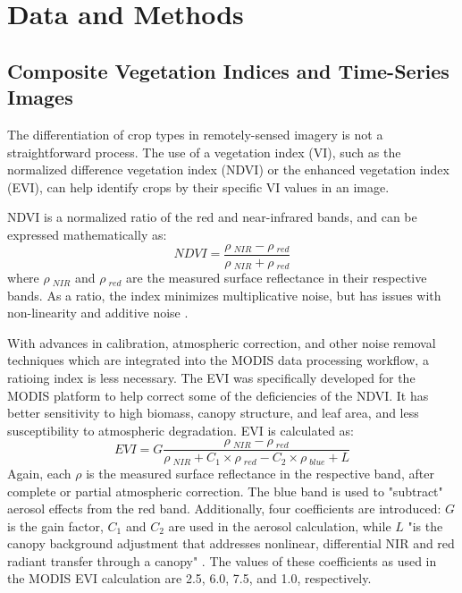 \chapter{Data and Methods}

\section{Composite Vegetation Indices and Time-Series Images}

The differentiation of crop types in remotely-sensed imagery is not a straightforward process. The use of a vegetation index (VI), such as the normalized difference vegetation index (NDVI) or the enhanced vegetation index (EVI), can help identify crops by their specific VI values in an image.

NDVI is a normalized ratio of the red and near-infrared bands, and can be expressed mathematically as:
\begin{equation}
  NDVI = \frac{\rho~_{NIR} - \rho~_{red}}{\rho~_{NIR} + \rho~_{red}}
\end{equation}
where $\rho~_{NIR}$ and $\rho~_{red}$ are the measured surface reflectance in their respective bands. As a ratio, the index minimizes multiplicative noise, but has issues with non-linearity and additive noise \autocite{huete2002overview}.

With advances in calibration, atmospheric correction, and other noise removal techniques which are integrated into the MODIS data processing workflow, a ratioing index is less necessary. The EVI was specifically developed for the MODIS platform to help correct some of the deficiencies of the NDVI. It has better sensitivity to high biomass, canopy structure, and leaf area, and less susceptibility to atmospheric degradation. EVI is calculated as:
\begin{equation}
  EVI = G\frac{\rho~_{NIR} - \rho~_{red}}{\rho~_{NIR} +  C_1\times\rho~_{red} - C_2 \times \rho~_{blue} + L}
\end{equation}
Again, each $\rho$ is the measured surface reflectance in the respective band, after complete or partial atmospheric correction. The blue band is used to "subtract" aerosol effects from the red band. Additionally, four coefficients are introduced: $G$ is the gain factor, $C_1$ and $C_2$ are used in the aerosol calculation, while $L$ "is the canopy background adjustment that addresses nonlinear, differential NIR and red radiant transfer through a canopy" \citereset\autocite[196]{huete2002overview}. The values of these coefficients as used in the MODIS EVI calculation are 2.5, 6.0, 7.5, and 1.0, respectively.

